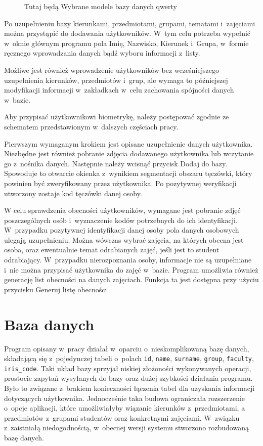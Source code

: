 \begin{figure}
\begin{center}
\caption{Tutaj będą Wybrane modele bazy danych qwerty}
\label{fig:wybraneTabele}
\end{center}
\end{figure}

Po uzupełnieniu bazy kierunkami, przedmiotami, grupami, tematami i~zajęciami można przystąpić do dodawania użytkowników. W~tym celu potrzeba wypełnić w~oknie głównym programu pola Imię, Nazwisko, Kierunek i~Grupa, w~formie ręcznego wprowadzania danych bądź wyboru informacji z~listy.

Możliwe jest również wprowadzenie użytkowników bez wcześniejszego uzupełnienia kierunków, przedmiotów i~grup, ale wymaga to późniejszej modyfikacji informacji w~zakładkach w~celu zachowania spójności danych w~bazie.

Aby przypisać użytkownikowi biometrykę, należy postępować zgodnie ze schematem przedstawionym w~dalszych częściach pracy.

Pierwszym wymaganym krokiem jest opisane uzupełnienie danych użytkownika. Niezbędne jest również pobranie zdjęcia dodawanego użytkownika lub wczytanie  go z~nośnika danych. Następnie należy wcisnąć przycisk Dodaj do bazy. Spowoduje to otwarcie okienka z~wynikiem segmentacji obszaru tęczówki, który powinien być zweryfikowany przez użytkownika. Po pozytywnej weryfikacji utworzony zostaje kod tęczówki danej osoby.

W celu sprawdzenia obecności użytkowników, wymagane jest pobranie zdjęć poszczególnych osób i~wyznaczenie kodów potrzebnych do ich identyfikacji. W~przypadku pozytywnej identyfikacji danej osoby pola danych osobowych ulegają uzupełnieniu. Można wówczas wybrać zajęcia, na których obecna jest osoba, oraz ewentualnie temat odrabianych zajęć, jeśli jest to student odrabiający. W~przypadku nierozpoznania osoby, informacje nie są uzupełniane i~nie można przypisać użytkownika do zajęć w~bazie.
Program umożliwia również generację list obecności na danych zajęciach. Funkcja ta jest dostępna przy użyciu przycisku Generuj listę obecności.
\section{Baza danych}
\label{sec:bazadanych}

Program opisany w~pracy \cite{Gl11} działał w~oparciu o~nieskomplikowaną bazę danych, składającą się z~pojedynczej tabeli o~polach \verb!id!, \verb!name!, \verb!surname!, \verb!group!, \verb!faculty!, \verb!iris_code!. Taki układ bazy sprzyjał niskiej złożoności wykonywanych operacji, prostocie zapytań wysyłanych do bazy oraz dużej szybkości działania programu. Było to związane z~brakiem konieczności łączenia tabel dla uzyskania informacji dotyczących użytkownika. Jednocześnie taka budowa ograniczała rozszerzenie o~opcje aplikacji, które umożliwiałyby wiązanie kierunków z~przedmiotami, a przedmiotów z~grupami studentów oraz konkretnymi zajęciami. W~związku z~zaistniałą niedogodnością, w~obecnej wersji systemu stworzono rozbudowaną bazę danych.

